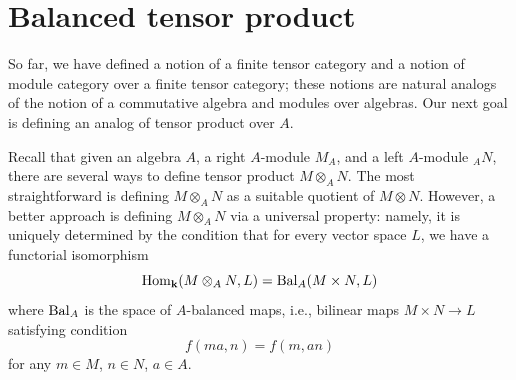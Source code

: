 %
%
%
%
%


\section{Balanced tensor product}\label{s:balanced-product}

So far, we have defined a notion of a finite tensor category and a notion of
module category over a finite tensor category; these notions are natural
analogs of the notion of a commutative algebra and modules over algebras. Our
next goal is defining an analog of tensor product over $A$.

Recall that given an algebra $A$, a right $A$-module $M_A$, and a left
$A$-module ${}_AN$, there are several ways to define tensor product $M
\otimes_A N$. The most straightforward is defining $M\otimes_A N$ as a suitable
quotient of $M\otimes N$. However, a better approach is defining $M\otimes_A N$
via a universal property: namely, it is uniquely determined by the condition
that for every vector space $L$, we have a functorial isomorphism
$$
\operatorname{Hom}_{\mathbf{k}}(M\otimes_A N, L) = \operatorname{Bal}_A(M \times N, L)
$$
where $\operatorname{Bal}_A$ is the space of $A$-balanced maps, i.e., bilinear maps $M\times N
\to L$ satisfying condition
$$
f(ma, n) = f(m, an)
$$
for any $m\in M$, $n\in N$, $a\in A$.

